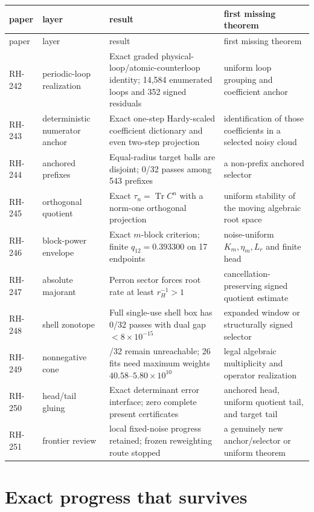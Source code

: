 \documentclass[11pt]{article}
\newcommand{\Tr}{\operatorname{Tr}}
\begin{document}
\small
\begin{longtable}{>{\raggedright\arraybackslash}p{}
>{\raggedright\arraybackslash}p{}
>{\raggedright\arraybackslash}p{}
>{\raggedright\arraybackslash}p{}}
\toprule
paper & layer & result & first missing theorem\\
\midrule
\endfirsthead
\toprule
paper & layer & result & first missing theorem\\
\midrule
\endhead
RH-242 & periodic-loop realization & Exact graded physical-loop/atomic-counterloop identity; 14,584 enumerated loops and 352 signed residuals & uniform loop grouping and coefficient anchor\\
RH-243 & deterministic numerator anchor & Exact one-step Hardy-scaled coefficient dictionary and even two-step projection & identification of those coefficients in a selected noisy cloud\\
RH-244 & anchored prefixes & Equal-radius target balls are disjoint; 0/32 passes among 543 prefixes & a non-prefix anchored selector\\
RH-245 & orthogonal quotient & Exact $\tau_n=\Tr C^n$ with a norm-one orthogonal projection & uniform stability of the moving algebraic root space\\
RH-246 & block-power envelope & Exact $m$-block criterion; finite $q_{12}=0.393300$ on 17 endpoints & noise-uniform $K_m,\eta_m,L_r$ and finite head\\
RH-247 & absolute majorant & Perron sector forces root rate at least $r_H^{-1}>1$ & cancellation-preserving signed quotient estimate\\
RH-248 & shell zonotope & Full single-use shell box has 0/32 passes with dual gap $<8\times10^{-15}$ & expanded window or structurally signed selector\\
RH-249 & nonnegative cone & 6/32 remain unreachable; 26 fits need maximum weights $40.58$--$5.80\times10^{10}$ & legal algebraic multiplicity and operator realization\\
RH-250 & head/tail gluing & Exact determinant error interface; zero complete present certificates & anchored head, uniform quotient tail, and target tail\\
RH-251 & frontier review & local fixed-noise progress retained; frozen reweighting route stopped & a genuinely new anchor/selector or uniform theorem\\
\bottomrule
\end{longtable}
\normalsize

\section{Exact progress that survives}
\end{document}
